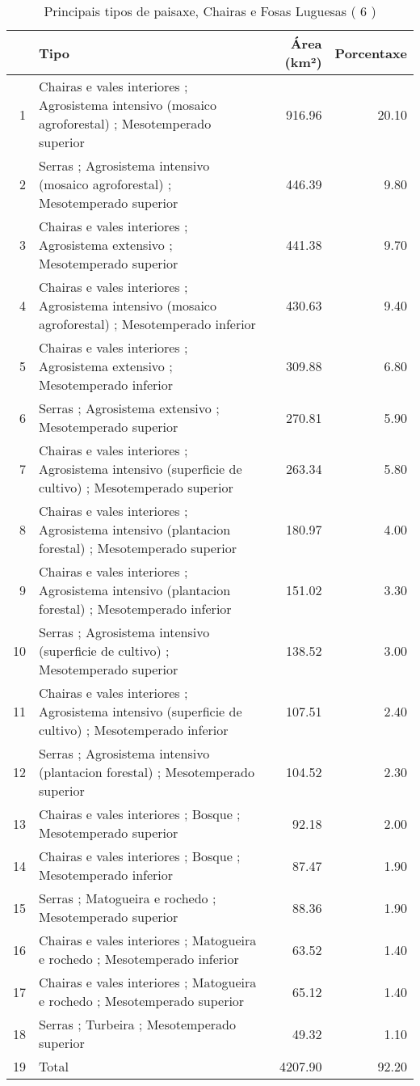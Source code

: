 \begin{table}[p]
\centering
\caption{Principais tipos de paisaxe,  Chairas e Fosas Luguesas ( 6 )} 
\label{Tipos 6}
\begin{tabular}{rlrr}
  \hline
 & Tipo & Área (km²) & Porcentaxe \\ 
  \hline
1 & Chairas e vales interiores ; Agrosistema intensivo (mosaico agroforestal) ; Mesotemperado superior & 916.96 & 20.10 \\ 
  2 & Serras ; Agrosistema intensivo (mosaico agroforestal) ; Mesotemperado superior & 446.39 & 9.80 \\ 
  3 & Chairas e vales interiores ; Agrosistema extensivo ; Mesotemperado superior & 441.38 & 9.70 \\ 
  4 & Chairas e vales interiores ; Agrosistema intensivo (mosaico agroforestal) ; Mesotemperado inferior & 430.63 & 9.40 \\ 
  5 & Chairas e vales interiores ; Agrosistema extensivo ; Mesotemperado inferior & 309.88 & 6.80 \\ 
  6 & Serras ; Agrosistema extensivo ; Mesotemperado superior & 270.81 & 5.90 \\ 
  7 & Chairas e vales interiores ; Agrosistema intensivo (superficie de cultivo) ; Mesotemperado superior & 263.34 & 5.80 \\ 
  8 & Chairas e vales interiores ; Agrosistema intensivo (plantacion forestal) ; Mesotemperado superior & 180.97 & 4.00 \\ 
  9 & Chairas e vales interiores ; Agrosistema intensivo (plantacion forestal) ; Mesotemperado inferior & 151.02 & 3.30 \\ 
  10 & Serras ; Agrosistema intensivo (superficie de cultivo) ; Mesotemperado superior & 138.52 & 3.00 \\ 
  11 & Chairas e vales interiores ; Agrosistema intensivo (superficie de cultivo) ; Mesotemperado inferior & 107.51 & 2.40 \\ 
  12 & Serras ; Agrosistema intensivo (plantacion forestal) ; Mesotemperado superior & 104.52 & 2.30 \\ 
  13 & Chairas e vales interiores ; Bosque ; Mesotemperado superior & 92.18 & 2.00 \\ 
  14 & Chairas e vales interiores ; Bosque ; Mesotemperado inferior & 87.47 & 1.90 \\ 
  15 & Serras ; Matogueira e rochedo ; Mesotemperado superior & 88.36 & 1.90 \\ 
  16 & Chairas e vales interiores ; Matogueira e rochedo ; Mesotemperado inferior & 63.52 & 1.40 \\ 
  17 & Chairas e vales interiores ; Matogueira e rochedo ; Mesotemperado superior & 65.12 & 1.40 \\ 
  18 & Serras ; Turbeira ; Mesotemperado superior & 49.32 & 1.10 \\ 
  19 & Total & 4207.90 & 92.20 \\ 
   \hline
\end{tabular}
\end{table}
